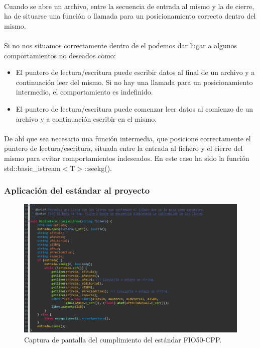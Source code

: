 			\paragraph{}Cuando se abre un archivo, entre la secuencia de entrada al mismo y la de cierre, ha de situarse una función o llamada para un posicionamiento correcto dentro del mismo.
			
			\paragraph{}Si no nos situamos correctamente dentro de el podemos dar lugar a algunos comportamientos no deseados como:
			
			\begin{itemize}
				\item El puntero de lectura/escritura puede escribir datos al final de un archivo y a continuación leer del mismo. Si no hay una llamada para un posicionamiento intermedio, el comportamiento es indefinido.
				\item El puntero de lectura/escritura puede comenzar leer datos al comienzo de un archivo y a continuación escribir en el mismo.
			\end{itemize}
		
			\paragraph{}De ahí que sea necesario una función intermedia, que posicione correctamente el puntero de lectura/escritura, situada entre la entrada al fichero y el cierre del mismo para evitar comportamientos indeseados. En este caso ha sido la función std::basic\_istream$<$T$>$::seekg().
		
		\subsubsection{Aplicación del estándar al proyecto}
		
			\begin{figure}[H]
				\centering
				\includegraphics[scale=0.8]{img/img7.png}
				\caption{Captura de pantalla del cumplimiento del estándar FIO50-CPP.}
				\label{img7}
			\end{figure}
		
